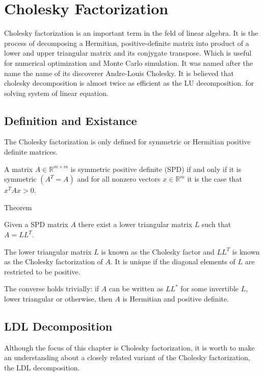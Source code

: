 
\chapter{Cholesky Factorization} %

\label{chptr:cholesky} %

Cholesky factorization is an important term in the feld of linear algebra. It is the process of decomposing a Hermitian, positive-definite matrix into product of a lower and upper triangular matrix and its conjygate transpose. Which is useful for numerical optimization and Monte Carlo simulation. It was named after the name the name of its discoverer Andre-Louis Cholesky. It is believed that cholesky decomposition is almost twice as efficient as the LU decomposition. for solving system of linear equation.

\section{Definition and Existance}
The Cholesky factorization is only defined for symmetric or Hermitian positive definite matrices.
\begin{definition}
A matrix $A\in \mathbb{R}^{m\times m}$ is symmetric positive definite (SPD) if and only if it is symmetric $(A^T=A)$ and for all nonzero vectors $x\in \mathbb{R}^m$ it is the case that $x^TAx>0$.	
\end{definition}

\begin{mybox}{Theorem}
\begin{theorem}
	Given a SPD matrix $A$ there exist a lower triangular matrix $L$ such that $A=LL^T$.
\end{theorem}
\end{mybox}
The lower triangular matrix $L$ is known as the Cholesky factor and $LL^T$ is known as the Cholesky factorization of $A$. It is unique if the diagonal elements of $L$ are restricted to be positive.

The converse holds trivially: if $A$ can be written as $LL^*$ for some invertible $L$, lower triangular or otherwise, then $A$ is Hermitian and positive definite.
\section{LDL Decomposition}
Although the focus of this chapter is Cholesky factorization, it is worth to make an understanding about a closely related variant of the Cholesky factorization, the LDL decomposition.

